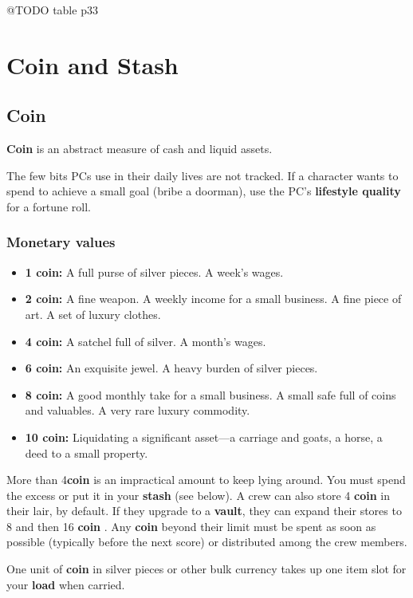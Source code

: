 \documentclass[11pt,oneside]{book}
\newcommand{\gameterm}[1]{\textbf{#1}}
\begin{document}
@TODO table p33

\chapter{Coin and Stash}

\section{Coin}

\gameterm{Coin}  is an abstract measure of cash and liquid assets.

The few bits PCs use in their daily lives are not tracked. If a character wants to spend to achieve a small goal (bribe a doorman), use the PC’s \textbf{lifestyle quality} for a fortune roll.

\subsection{Monetary values}

\begin{itemize}
	\item \gameterm{1 coin: } A full purse of silver pieces. A week’s wages.
	\item \gameterm{2 coin:}  A fine weapon. A weekly income for a small business. A fine piece of art. A set of luxury clothes.
	\item \gameterm{4 coin:}  A satchel full of silver. A month’s wages.
	\item \gameterm{6 coin:}  An exquisite jewel. A heavy burden of silver pieces.
	\item \gameterm{8 coin:}  A good monthly take for a small business. A small safe full of coins and valuables. A very rare luxury commodity.
	\item \gameterm{10 coin:}  Liquidating a significant asset---a carriage and goats, a horse, a deed to a small property.
\end{itemize}

More than 4\gameterm{coin}  is an impractical amount to keep lying around. You must spend the excess or put it in your \textbf{stash} (see below). A crew can also store 4 \gameterm{coin}  in their lair, by default. If they upgrade to a \textbf{vault}, they can expand their stores to 8 and then 16 \gameterm{coin} . Any \gameterm{coin}  beyond their limit must be spent as soon as possible (typically before the next score) or distributed among the crew members.

One unit of \gameterm{coin}  in silver pieces or other bulk currency takes up one item slot for your \textbf{load} when carried.
\end{document}
